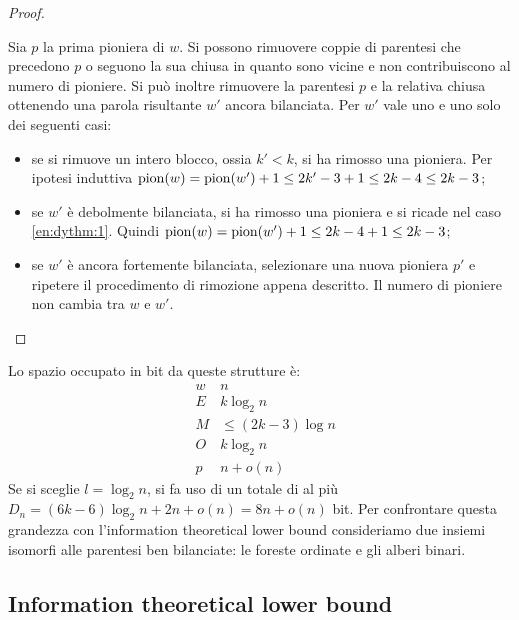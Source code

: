 \begin{proof}
\begin{itemize}
\begin{enumerate}
			            Sia $p$ la prima pioniera di $w$. Si possono rimuovere coppie di parentesi che precedono $p$ o seguono la sua chiusa in quanto sono vicine e non contribuiscono al numero di pioniere. Si può inoltre rimuovere la parentesi $p$ e la relativa chiusa ottenendo una parola risultante $w'$ ancora bilanciata. Per $w'$ vale uno e uno solo dei seguenti casi:
			            \begin{itemize}
				            \item se si rimuove un intero blocco, ossia $k'<k$, si ha rimosso una pioniera. Per ipotesi induttiva $\mathrm{pion}(w)=\mathrm{pion}(w')+1\leq 2k'-3+1\leq 2k-4\leq 2k-3$;
				            \item se $w'$ è debolmente bilanciata, si ha rimosso una pioniera e si ricade nel caso \ref{en:dythm:1}. Quindi $\mathrm{pion}(w)=\mathrm{pion}(w')+1\leq 2k-4+1\leq 2k-3$;
				            \item se $w'$ è ancora fortemente bilanciata, selezionare una nuova pioniera $p'$ e ripetere il procedimento di rimozione appena descritto. Il numero di pioniere non cambia tra $w$ e $w'$.
			            \end{itemize}
		      \end{enumerate}
	\end{itemize}
\end{proof}

Lo spazio occupato in bit da queste strutture è:
\begin{equation*}
	\begin{aligned}
		 & w & n                 \\
		 & E & k  \log_2 n       \\
		 & M & \leq (2k-3)\log n \\
		 & O & k  \log_2 n       \\
		 & p & n + o(n)
	\end{aligned}
\end{equation*}
Se si sceglie $l=\log_2 n$, si fa uso di un totale di al più $D_n=(6k-6)\log_2 n+2n+o(n)=8n+o(n)$ bit.
Per confrontare questa grandezza con l'information theoretical lower bound consideriamo due insiemi isomorfi alle parentesi ben bilanciate: le foreste ordinate e gli alberi binari.


\subsection{Information theoretical lower bound}

